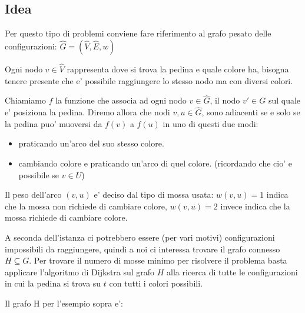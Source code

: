 \documentclass{article}
\begin{document}
\subsection{Idea}
Per questo tipo di problemi conviene fare riferimento al grafo pesato delle configurazioni: $\hat G = (\hat V, \hat E, w)$

Ogni nodo $v \in \hat V$ rappresenta dove si trova la pedina e quale colore ha, 
bisogna tenere presente che e' possibile raggiungere lo stesso nodo ma con diversi colori.

Chiamiamo $f$ la funzione che associa ad ogni nodo $v \in \hat G$, il nodo $v' \in G$ sul quale e' posiziona la pedina.
Diremo allora che nodi $v,u \in \hat G$, sono adiacenti se e solo se la pedina puo' muoversi da $f(v)$ a $f(u)$ in uno di questi due modi:
\begin{itemize}
    \item praticando un'arco del suo stesso colore.
    \item cambiando colore e praticando un'arco di quel colore. (ricordando che cio' e possibile se $v \in U$)
\end{itemize}

Il peso dell'arco $(v,u)$ e' deciso dal tipo di mossa usata: $w(v,u)=1$ indica che la mossa non richiede di cambiare colore, $w(v,u)=2$ invece indica che la mossa richiede di cambiare colore. 

A seconda dell'istanza ci potrebbero essere (per vari motivi) configurazioni impossibili da raggiungere, quindi a noi ci interessa 
trovare il grafo connesso $H \subseteq G$. 
Per trovare il numero di mosse minimo per risolvere il problema basta applicare l'algoritmo di Dijkstra sul grafo $H$ alla ricerca di tutte le configurazioni
in cui la pedina si trova su $t$ con tutti i colori possibili.

Il grafo H per l'esempio sopra e':


\end{document}
